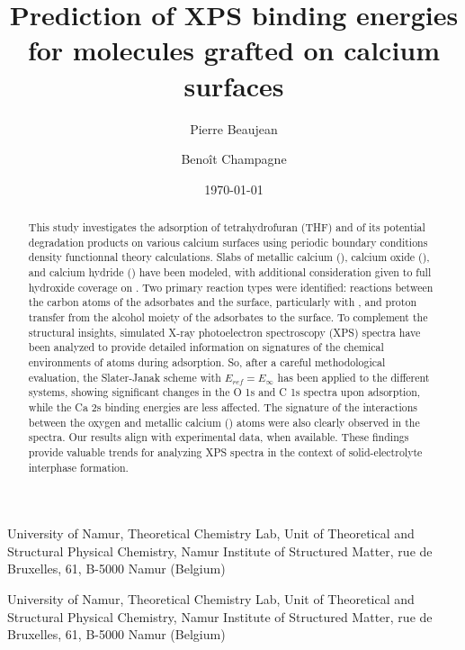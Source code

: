 \documentclass[%
aip,
amsmath,amssymb,
preprint,%
jcp,
showkeys,
]{revtex4-2}
\begin{document}
	
\title{Prediction of XPS binding energies for molecules grafted on calcium surfaces}

\author{Pierre Beaujean}
\affiliation
{University of Namur, Theoretical Chemistry Lab, Unit of Theoretical and Structural Physical Chemistry, Namur Institute of Structured Matter, rue de Bruxelles, 61, B-5000 Namur (Belgium)}


\author{Benoît Champagne}
\affiliation
{University of Namur, Theoretical Chemistry Lab, Unit of Theoretical and Structural Physical Chemistry, Namur Institute of Structured Matter, rue de Bruxelles, 61, B-5000 Namur (Belgium)}

\date{\today}

\begin{abstract} %
	This study investigates the adsorption of tetrahydrofuran (THF) and of its potential degradation products on various calcium surfaces using periodic boundary conditions density functionnal theory calculations. Slabs of metallic calcium (), calcium oxide (), and calcium hydride () have been modeled, with additional consideration given to full hydroxide coverage on . Two primary reaction types were identified: reactions between the carbon atoms of the adsorbates and the surface, particularly with , and proton transfer from the alcohol moiety of the adsorbates to the  surface. To complement the structural insights, simulated X-ray photoelectron spectroscopy (XPS) spectra have been analyzed to provide detailed information on signatures of the chemical environments of atoms during adsorption. So, after a careful methodological evaluation, the Slater-Janak scheme with $E_{ref}=E_\infty$ has been applied to the different systems, showing significant changes in the O 1s and C 1s spectra upon adsorption, while the Ca 2s binding energies are less affected. The signature of the interactions between the oxygen and metallic calcium () atoms were also clearly observed in the spectra. Our results align with experimental data, when available.	These findings provide valuable trends for analyzing XPS spectra in the context of solid-electrolyte interphase formation. 
\end{abstract}


\maketitle
\end{document}
